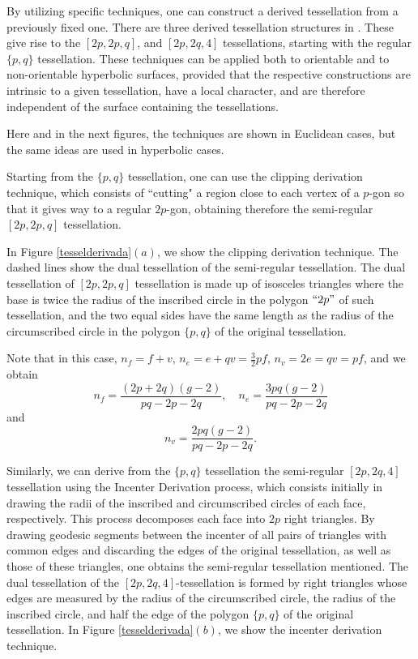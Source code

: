 \documentclass[%
reprint,
amsmath,amssymb,
aps,
]{revtex4-2}
\begin{document}
By utilizing specific techniques, one can construct a derived tessellation from a previously fixed one. There are three derived tessellation structures in \cite{Douglas1}. These give rise to the $ [2p,2p,q] $, and $ [2p,2q, 4] $ tessellations, starting with the regular $\{p,q\}$ tessellation. These techniques can be applied both to orientable and to non-orientable hyperbolic surfaces, provided that the respective constructions are intrinsic to a given tessellation, have a local character, and are therefore independent of the surface containing the tessellations.

Here and in the next figures, the techniques are shown in Euclidean cases, but the same ideas are used in hyperbolic cases. 

Starting from the $\{p,q\}$ tessellation, one can use the clipping derivation technique, which consists of ``cutting" a region close to each vertex of a $p$-gon so that it gives way to a regular $2p$-gon, obtaining therefore the semi-regular $[2p,2p,q]$ tessellation.

In Figure \ref*{tesselderivada}$(a)$, we show the clipping derivation technique. The dashed lines show the dual tessellation of the semi-regular tessellation. The dual tessellation of $[2p,2p,q]$ tessellation is made up of isosceles triangles where the base is twice the radius of the inscribed circle in the polygon $``2p"$ of such tessellation, and the two equal sides have the same length as the radius of the circumscribed circle in the polygon $\{p,q\}$ of the original tessellation.

Note that in this case, $n_f = f + v$, $n_e = e + q v = \frac{3}{2} p f$, $n_v = 2 e = q v = p f$, and we obtain
\[
n_f = \dfrac{(2p+2q)(g-2)}{pq-2p-2q}, \quad n_e =\dfrac{3pq(g-2)}{pq-2p-2q}
\]
and  
\[
n_v =  \dfrac{2pq(g-2)}{pq-2p-2q}.
\]

Similarly, we can derive from the $\{p, q\}$ tessellation the semi-regular $[2p, 2q, 4]$ tessellation using the Incenter Derivation process, which consists initially in drawing the radii of the inscribed and circumscribed circles of each face, respectively. This process decomposes each face into $2p$ right triangles. By drawing geodesic segments between the incenter of all pairs of triangles with common edges and discarding the edges of the original tessellation, as well as those of these triangles, one obtains the semi-regular tessellation mentioned. The dual tessellation of the $[2p,2q,4]$-tessellation is formed by right triangles whose edges are measured by the radius of the circumscribed circle, the radius of the inscribed circle, and half the edge of the polygon $\{p,q\}$ of the original tessellation. In Figure \ref*{tesselderivada}$(b)$, we show the incenter derivation technique.
\end{document}
